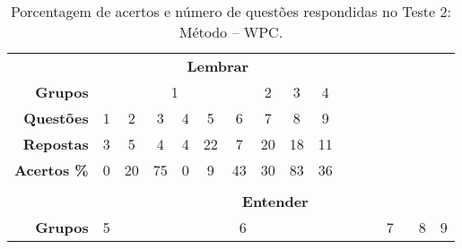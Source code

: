 \begin{table}[htbp]
    \centering
    \caption{Porcentagem de acertos e número de questões respondidas no Teste 2: Método -- WPC.}
    \label{tab:respostas_atualizada_teste2}
    \begin{tabular}{rccccclllllllllll}
    \cline{1-10}
    \multicolumn{1}{|l|}{} & \multicolumn{9}{c|}{\cellcolor{green!25}\textbf{Lembrar}} &  &  &  &  &  &  &  \\ \cline{1-10}
    \multicolumn{1}{|r|}{\textbf{Grupos}} & \multicolumn{6}{c|}{1} & \multicolumn{1}{c|}{2} & \multicolumn{1}{c|}{3} & \multicolumn{1}{c|}{4} &  &  &  &  &  &  &  \\ \cline{1-10}
    \multicolumn{1}{|r|}{\cellcolor[HTML]{D9D9D9}\textbf{Questões}} & \multicolumn{1}{c|}{\cellcolor[HTML]{D9D9D9}1} & \multicolumn{1}{c|}{\cellcolor[HTML]{D9D9D9}2} & \multicolumn{1}{c|}{\cellcolor[HTML]{D9D9D9}3} & \multicolumn{1}{c|}{\cellcolor[HTML]{D9D9D9}4} & \multicolumn{1}{c|}{\cellcolor[HTML]{D9D9D9}5} & \multicolumn{1}{c|}{\cellcolor[HTML]{D9D9D9}6} & \multicolumn{1}{c|}{\cellcolor[HTML]{D9D9D9}7} & \multicolumn{1}{c|}{\cellcolor[HTML]{D9D9D9}8} & \multicolumn{1}{c|}{\cellcolor[HTML]{D9D9D9}9} &  &  &  &  &  &  &  \\ 
    \multicolumn{1}{|r|}{\textbf{Repostas}} & \multicolumn{1}{c|}{3} & \multicolumn{1}{c|}{5} & \multicolumn{1}{c|}{4} & \multicolumn{1}{c|}{4} & \multicolumn{1}{c|}{22} & \multicolumn{1}{c|}{7} & \multicolumn{1}{c|}{20} & \multicolumn{1}{c|}{18} & \multicolumn{1}{c|}{11} &  &  &  &  &  &  &  \\ 
    \multicolumn{1}{|r|}{\cellcolor[HTML]{D9D9D9}\textbf{Acertos \%}} & \multicolumn{1}{c|}{\cellcolor[HTML]{D9D9D9}0} & \multicolumn{1}{c|}{\cellcolor[HTML]{D9D9D9}20} & \multicolumn{1}{c|}{\cellcolor[HTML]{D9D9D9}75} & \multicolumn{1}{c|}{\cellcolor[HTML]{D9D9D9}0} & \multicolumn{1}{c|}{\cellcolor[HTML]{D9D9D9}9} & \multicolumn{1}{c|}{\cellcolor[HTML]{D9D9D9}43} & \multicolumn{1}{c|}{\cellcolor[HTML]{D9D9D9}30} & \multicolumn{1}{c|}{\cellcolor[HTML]{D9D9D9}83} & \multicolumn{1}{c|}{\cellcolor[HTML]{D9D9D9}36} &  &  &  &  &  &  &  \\ \cline{1-10}
    \multicolumn{1}{l}{} & \multicolumn{1}{l}{} & \multicolumn{1}{l}{} & \multicolumn{1}{l}{} & \multicolumn{1}{l}{} & \multicolumn{1}{l}{} &  &  &  &  &  &  &  &  &  &  &  \\ \hline
    \multicolumn{1}{|l|}{} & \multicolumn{16}{c|}{\cellcolor{yellow!25}\textbf{Entender}} \\ \hline
    \multicolumn{1}{|r|}{\textbf{Grupos}} & \multicolumn{1}{c|}{5} & \multicolumn{10}{c|}{6} & \multicolumn{3}{c|}{7} & \multicolumn{1}{c|}{8} & \multicolumn{1}{c|}{9} \\ \hline

\end{tabular}
\end{table}

